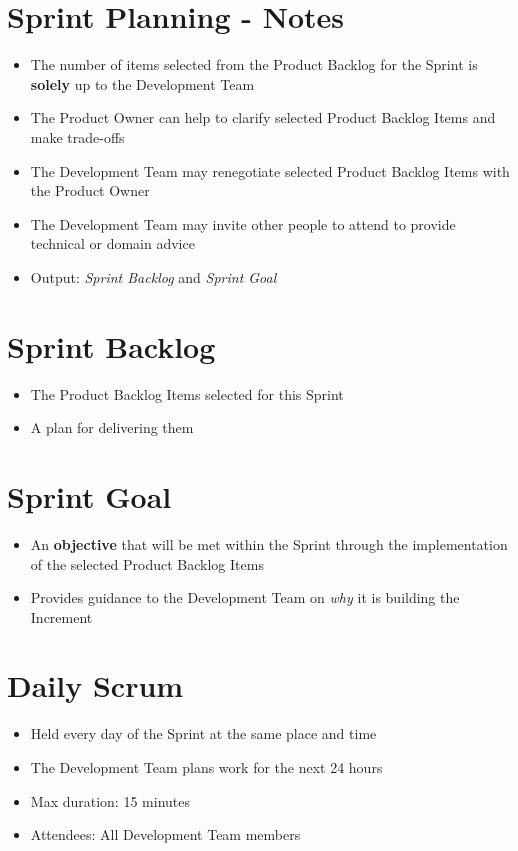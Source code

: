 \documentclass[a4paper,11pt,twocolumn]{article}
\begin{document}
\section*{Sprint Planning - Notes}
\begin{itemize}
    \item The number of items selected from the Product Backlog for the Sprint is \textbf{solely} up to the Development Team
	\item The Product Owner can help to clarify selected Product Backlog Items and make trade-offs
	\item The Development Team may renegotiate selected Product Backlog Items with the Product Owner
	\item The Development Team may invite other people to attend to provide technical or domain advice
	\item Output: \textit{Sprint Backlog} and \textit{Sprint Goal}
\end{itemize}

\section*{Sprint Backlog}
\begin{itemize}
    \item The Product Backlog Items selected for this Sprint
    \item A plan for delivering them
\end{itemize}

\section*{Sprint Goal}
\begin{itemize}
    \item An \textbf{objective} that will be met within the Sprint through the implementation of the selected Product Backlog Items
    \item Provides guidance to the Development Team on \textit{why} it is building the Increment
\end{itemize}

\section*{Daily Scrum}
\begin{itemize}
    \item Held every day of the Sprint at the same place and time
    \item The Development Team plans work for the next 24 hours
	\item Max duration: 15 minutes
	\item Attendees: All Development Team members
\end{itemize}
\end{document}

